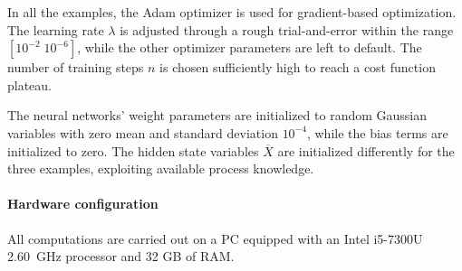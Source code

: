 \documentclass{article} %
\newcommand{\numiter}{n}
\newcommand{\hidden}[1]{\overline{#1}}
\begin{document}
In all the examples, the Adam optimizer is used for gradient-based optimization. The learning rate $\lambda$ is adjusted through a rough trial-and-error within the range $[10^{-2}\; 10^{-6}]$, while the other optimizer parameters are left to default. The number of training steps $\numiter$ is chosen sufficiently high to reach a cost function plateau.

The neural networks' weight parameters are initialized to random Gaussian 
variables with zero mean and standard deviation $10^{-4}$, while the bias terms are initialized to zero. The hidden state variables $\hidden{X}$ are initialized differently for the three examples, exploiting available process knowledge.

\paragraph{Hardware configuration} All computations are carried out on a PC equipped with an Intel i5-7300U 2.60~GHz processor and 32 GB of RAM.  
\end{document}
